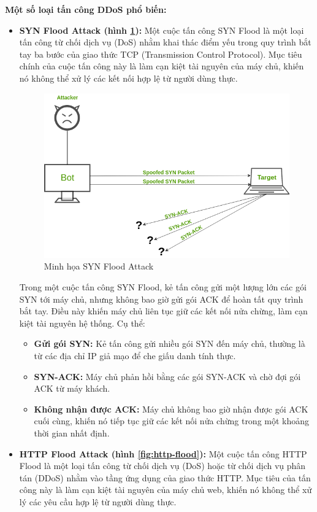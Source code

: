 \documentclass[a4paper]{article}
\begin{document}
\textbf{Một số loại tấn công DDoS phổ biến:}
\begin{itemize}
    \item \textbf{SYN Flood Attack (hình \ref{fig:syn-flood}): } Một cuộc tấn công SYN Flood là một loại tấn công từ chối dịch vụ (DoS) nhằm khai thác điểm yếu trong quy trình bắt tay ba bước của giao thức TCP (Transmission Control Protocol). Mục tiêu chính của cuộc tấn công này là làm cạn kiệt tài nguyên của máy chủ, khiến nó không thể xử lý các kết nối hợp lệ từ người dùng thực.
    \begin{figure}
        \centering
        \includegraphics[width=0.6\linewidth]{images/syn-flood.png}
        \caption{Minh họa SYN Flood Attack\cite{geeksforgeeks_ddos_2}}
        \label{fig:syn-flood}
    \end{figure}
    Trong một cuộc tấn công SYN Flood, kẻ tấn công gửi một lượng lớn các gói SYN tới máy chủ, nhưng không bao giờ gửi gói ACK để hoàn tất quy trình bắt tay. Điều này khiến máy chủ liên tục giữ các kết nối nửa chừng, làm cạn kiệt tài nguyên hệ thống. Cụ thể:
    \begin{itemize}[label={}]
        \item \textbf{Gửi gói SYN:} Kẻ tấn công gửi nhiều gói SYN đến máy chủ, thường là từ các địa chỉ IP giả mạo để che giấu danh tính thực.
        \item \textbf{SYN-ACK:} Máy chủ phản hồi bằng các gói SYN-ACK và chờ đợi gói ACK từ máy khách.
        \item \textbf{Không nhận được ACK:} Máy chủ không bao giờ nhận được gói ACK cuối cùng, khiến nó tiếp tục giữ các kết nối nửa chừng trong một khoảng thời gian nhất định.
    \end{itemize}
    \item \textbf{HTTP Flood Attack (hình \ref{fig:http-flood}): } Một cuộc tấn công HTTP Flood là một loại tấn công từ chối dịch vụ (DoS) hoặc từ chối dịch vụ phân tán (DDoS) nhằm vào tầng ứng dụng của giao thức HTTP. Mục tiêu của tấn công này là làm cạn kiệt tài nguyên của máy chủ web, khiến nó không thể xử lý các yêu cầu hợp lệ từ người dùng thực.

\end{itemize}
\end{document}
